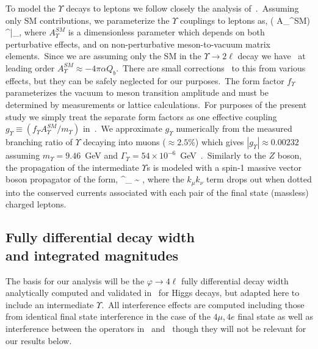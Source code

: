 \documentclass[nofootinbib,twocolumn,prl,preprintnumbers]{revtex4-1}
\begin{document}
To model the $\Upsilon$ decays to leptons we follow closely the analysis of~\cite{Aloni:2017eny}.~Assuming only SM contributions, we parameterize the $\Upsilon$ couplings to leptons as,
\bea\label{eq:LU}
 \supset 
( A_\Upsilon^{SM}) 
\Upsilon^\mu \bar\ell \gamma_\mu \ell ,
\eea
where $A_\Upsilon^{SM}$ is a dimensionless parameter which depends on both perturbative effects, and on non-perturbative meson-to-vacuum matrix elements.~Since we are assuming only the SM in the $\Upsilon \to 2\ell$ decay we have~\cite{VanRoyen:1967nq} at leading order $A_\Upsilon^{SM} \approx - 4\pi \alpha Q_b$.~There are small corrections~\cite{Aloni:2017eny} to this from various effects, but they can be safely neglected for our purposes.~The form factor $f_\Upsilon$ parameterizes the vacuum to meson transition amplitude and must be determined by measurements or lattice calculations.~For purposes of the present study we simply treat the separate form factors as one effective coupling $g_\Upsilon \equiv (f_\Upsilon A_\Upsilon^{SM}/m_\Upsilon)$ in~.~We approximate $g_\Upsilon$ numerically from the measured branching ratio of $\Upsilon$ decaying into muons ($\approx 2.5\%$) which gives $|g_ \Upsilon| \approx 0.00232$ assuming $m_\Upsilon = 9.46$~GeV and $\Gamma_\Upsilon = 54\times 10^{-6}$~GeV~\cite{Olive:2016xmw}.~Similarly to the $Z$ boson, the propagation of the intermediate $\Upsilon$s is modeled with a spin-1 massive vector boson propagator of the form,
%
\bea
{}^\Upsilon_{\mu\nu}
\sim
{},
\eea
%
where the $k_\mu k_\nu$ term drops out when dotted into the conserved currents associated with each pair of the final state (massless) charged leptons. 



\subsection{Fully differential decay width\\
and integrated magnitudes}
\label{subsec:fullydiffw}

The basis for our analysis will be the $\varphi \to 4\ell$ fully differential decay width analytically computed and validated in~\cite{Chen:2012jy,Chen:2013ejz,Khachatryan:2014kca} for Higgs decays, but adapted here to include an intermediate $\Upsilon$.~All interference effects are computed including those from identical final state interference in the case of the $4\mu, 4e$ final state as well as interference between the operators in~ and~ though they will not be relevant for our results below.
\end{document}
